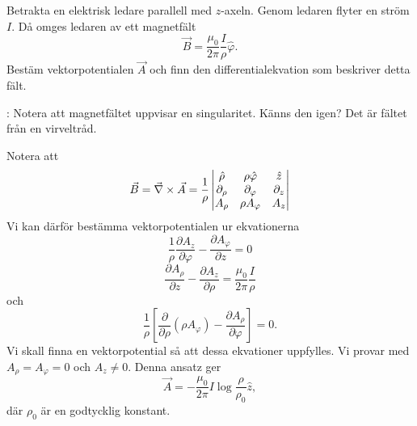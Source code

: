 \documentclass[%
oneside,                 %
final,                   %
10pt]{article}
\newcommand{\shortinlinecomment}[3]{{\color{red}{\bf #1}: #2}}
\newenvironment{notice_mdfboxadmon}[1][]{
\begin{notice_mdfboxmdframed}[frametitle=#1]
}
{
\end{notice_mdfboxmdframed}
}
\begin{document}
\begin{notice_mdfboxadmon}

Betrakta en elektrisk ledare parallell med $z$-axeln.  Genom ledaren flyter en ström $I$.  Då omges ledaren av ett magnetfält
$$
\vec{B} = \frac{\mu_0}{2\pi}\frac{I}{\rho}{\hat \varphi}.
$$
Bestäm vektorpotentialen $\vec{A}$ och finn den differentialekvation som beskriver detta fält.

\shortinlinecomment{Kommentar 1}{ Notera att magnetfältet uppvisar en singularitet. Känns den igen? Det är fältet från en virveltråd. }{ Notera att magnetfältet uppvisar }

Notera att
$$
\vec{B} = \vec{\nabla} \times \vec{A} = \frac{1}{\rho}
\begin{vmatrix}
\hat{\rho} & \rho \hat{\varphi} & \hat{z} \\
\partial_\rho & \partial_\varphi & \partial_z \\
A_\rho & {\rho A_\varphi} & A_z
\end{vmatrix} 
$$
Vi kan därför bestämma vektorpotentialen ur ekvationerna
\begin{equation}
  \frac{1}{\rho}\frac{\partial A_z}{\partial \varphi} - \frac{\partial A_\varphi}
{\partial z} = 0
\label{rho}
\end{equation}
\begin{equation}
  \frac{\partial A_\rho}{\partial z} - \frac{\partial A_z}{\partial \rho} =
\frac{\mu_0}{2\pi}\frac{I}{\rho}
\label{phi}
\end{equation}
och
\begin{equation}
  \frac{1}{\rho}\left[\frac{\partial}{\partial \rho} \left(\rho A_\varphi\right)
- \frac{\partial A_\rho}{\partial \varphi}\right] = 0.
\label{z}
\end{equation}
Vi skall finna en vektorpotential så att dessa ekvationer uppfylles. Vi provar med $A_\rho = A_\varphi=0$ och $A_z \neq 0$. Denna ansatz ger
\begin{equation}
  \vec{A} = - \frac{\mu_0}{2\pi} I \log\frac{\rho}{\rho_0} { \hat z},
\end{equation}
där $\rho_0$ är en godtycklig konstant.


\end{notice_mdfboxadmon}
\end{document}

